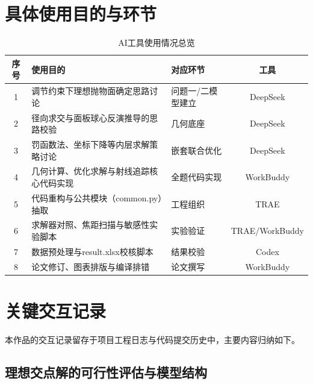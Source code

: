 \documentclass[12pt,a4paper]{article}
\begin{document}
\section{具体使用目的与环节}

\begin{table}[H]
\centering
\caption{AI工具使用情况总览}
\label{tab:ai-usage}
\renewcommand{\arraystretch}{1.3}
\begin{tabular}{|c|p{5.6cm}|p{4.4cm}|c|}
\hline
\textbf{序号} & \textbf{使用目的} & \textbf{对应环节} & \textbf{工具} \\
\hline
1 & 调节约束下理想抛物面确定思路讨论 & 问题一/二模型建立 & DeepSeek \\
\hline
2 & 径向求交与面板球心反演推导的思路校验 & 几何底座 & DeepSeek \\
\hline
3 & 罚函数法、坐标下降等内层求解策略讨论 & 嵌套联合优化 & DeepSeek \\
\hline
4 & 几何计算、优化求解与射线追踪核心代码实现 & 全题代码实现 & WorkBuddy \\
\hline
5 & 代码重构与公共模块（common.py）抽取 & 工程组织 & TRAE \\
\hline
6 & 求解器对照、焦距扫描与敏感性实验脚本 & 实验验证 & TRAE/WorkBuddy \\
\hline
7 & 数据预处理与result.xlsx校核脚本 & 结果校验 & Codex \\
\hline
8 & 论文修订、图表排版与编译排错 & 论文撰写 & WorkBuddy \\
\hline
\end{tabular}
\end{table}

\section{关键交互记录}

本作品的交互记录留存于项目工程日志与代码提交历史中，主要内容归纳如下。

\subsection{理想交点解的可行性评估与模型结构}
\end{document}
